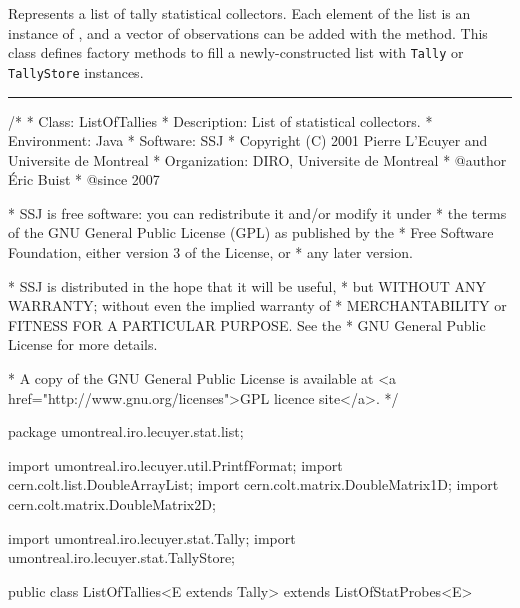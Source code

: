 
Represents a list of tally statistical collectors.
Each element of the list is an instance of ,
and a vector of observations can be added with
the  method.
This class defines factory methods to fill a newly-constructed list
with \texttt{Tally} or \texttt{TallyStore} instances.

\bigskip\hrule

\begin{code}
\begin{hide}
/*
 * Class:        ListOfTallies
 * Description:  List of statistical collectors.
 * Environment:  Java
 * Software:     SSJ 
 * Copyright (C) 2001  Pierre L'Ecuyer and Universite de Montreal
 * Organization: DIRO, Universite de Montreal
 * @author       Éric Buist 
 * @since        2007

 * SSJ is free software: you can redistribute it and/or modify it under
 * the terms of the GNU General Public License (GPL) as published by the
 * Free Software Foundation, either version 3 of the License, or
 * any later version.

 * SSJ is distributed in the hope that it will be useful,
 * but WITHOUT ANY WARRANTY; without even the implied warranty of
 * MERCHANTABILITY or FITNESS FOR A PARTICULAR PURPOSE.  See the
 * GNU General Public License for more details.

 * A copy of the GNU General Public License is available at
   <a href="http://www.gnu.org/licenses">GPL licence site</a>.
 */
\end{hide}
package umontreal.iro.lecuyer.stat.list;\begin{hide}

import umontreal.iro.lecuyer.util.PrintfFormat;
import cern.colt.list.DoubleArrayList;
import cern.colt.matrix.DoubleMatrix1D;
import cern.colt.matrix.DoubleMatrix2D;

import umontreal.iro.lecuyer.stat.Tally;
import umontreal.iro.lecuyer.stat.TallyStore;
\end{hide}


public class ListOfTallies<E extends Tally> extends ListOfStatProbes<E>\begin{hide} {
\end{hide}
\end{code}
